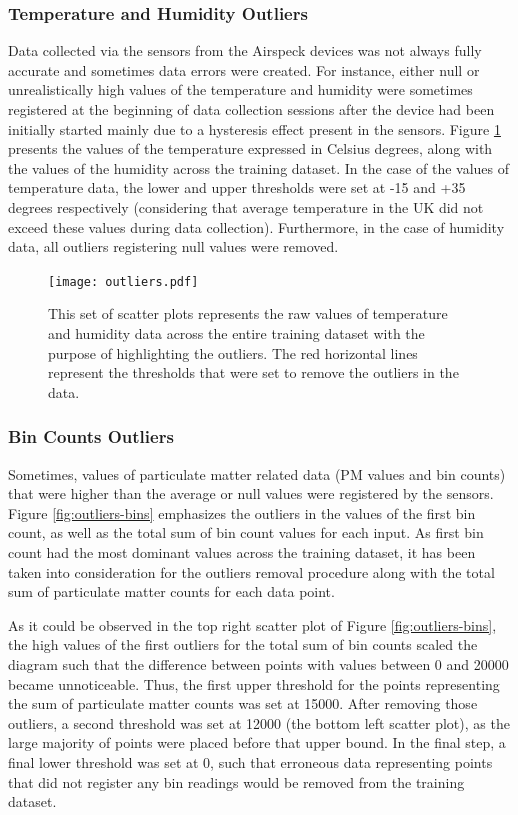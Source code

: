 \documentclass[bsc,frontabs,twoside,singlespacing, parskip,deptreport]{infthesis}     %
\begin{document}
\subsubsection*{Temperature and Humidity Outliers}

Data collected via the sensors from the Airspeck devices was not always fully accurate and sometimes data errors were created. For instance, either null or unrealistically high values of the temperature and humidity were sometimes registered at the beginning of data collection sessions after the device had been initially started mainly due to a hysteresis effect present in the sensors. Figure \ref{fig:outliers} presents the values of the temperature expressed in Celsius degrees, along with the values of the humidity across the training dataset. In the case of the values of temperature data, the lower and upper thresholds were set at -15 and +35 degrees respectively (considering that average temperature in the UK did not exceed these values during data collection). Furthermore, in the case of humidity data, all outliers registering null values were removed.

\begin{figure}[h!]
  \center
  \texttt{[image: outliers.pdf]}
  \caption{This set of scatter plots represents the raw values of temperature and humidity data across the entire training dataset with the purpose of highlighting the outliers. The red horizontal lines represent the thresholds that were set to remove the outliers in the data.}
  \label{fig:outliers}
\end{figure}

\subsubsection*{Bin Counts Outliers}

Sometimes, values of particulate matter related data (PM values and bin counts) that were higher than the average or null values were registered by the sensors. Figure \ref{fig:outliers-bins} emphasizes the outliers in the values of the first bin count, as well as the total sum of bin count values for each input. As first bin count had the most dominant values across the training dataset, it has been taken into consideration for the outliers removal procedure along with the total sum of particulate matter counts for each data point.

As it could be observed in the top right scatter plot of Figure \ref{fig:outliers-bins}, the high values of the first outliers for the total sum of bin counts scaled the diagram such that the difference between points with values between 0 and 20000 became unnoticeable. Thus, the first upper threshold for the points representing the sum of particulate matter counts was set at 15000. After removing those outliers, a second threshold was set at 12000 (the bottom left scatter plot), as the large majority of points were placed before that upper bound. In the final step, a final lower threshold was set at 0, such that erroneous data representing points that did not register any bin readings would be removed from the training dataset.
\end{document}
